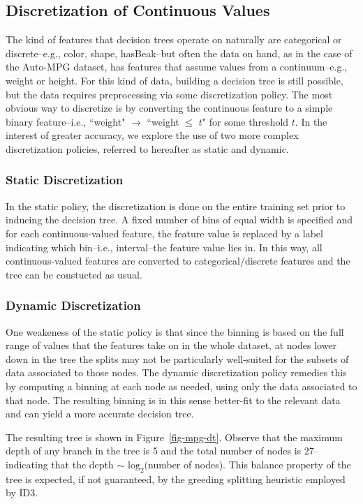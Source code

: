 \documentclass[12pt, conference, compsocconf]{IEEEtran}
\begin{document}
\subsection{Discretization of Continuous Values}
The kind of features that decision trees operate on naturally are categorical or discrete--e.g., color, shape, hasBeak--but often the data on hand, as in the case of the Auto-MPG dataset, has features that assume values from a continuum--e.g., weight or height.
For this kind of data, building a decision tree is still possible, but the data requires preprocessing via some discretization policy. 
The most obvious way to discretize is by converting the continuous feature to a simple binary feature--i.e., ``weight" $\rightarrow$ ``weight $\leq$ $t$" for some threshold $t$. 
In the interest of greater accuracy, we explore the use of two more complex discretization policies, referred to hereafter as static and dynamic.

\subsubsection{Static Discretization}
In the static policy, the discretization is done on the entire training set prior to inducing the decision tree. 
A fixed number of bins of equal width is specified and for each continuous-valued feature, the feature value is replaced by a label indicating which bin--i.e., interval--the feature value lies in. 
In this way, all continuous-valued features are converted to categorical/discrete features and the tree can be constucted as usual. 

\subsubsection{Dynamic Discretization}
One weakeness of the static policy is that since the binning is based on the full range of values that the features take on in the whole dataset, at nodes lower down in the tree the splits may not be particularly well-suited for the subsets of data associated to those nodes. 
The dynamic discretization policy remedies this by computing a binning at each node as needed, using only the data associated to that node. 
The resulting binning is in this sense better-fit to the relevant data and can yield a more accurate decision tree. 

The resulting tree is shown in Figure~\ref{fig-mpg-dt}. Observe that the maximum depth of any branch in the tree is 5 and the total number of nodes is 27--indicating that the depth $\sim$ $\text{log}_{2}($number of nodes). This balance property of the tree is expected, if not guaranteed, by the greeding splitting heuristic employed by ID3. 
\end{document}
